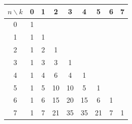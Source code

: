 \documentclass[punct]{ctexbeamer}
\begin{document}
\begin{frame}
    \begin{minipage}{0.65\linewidth}
        \begin{table}[]
            \begin{tabular}{c|cccccccc}
                $n\backslash k$ & 0 & 1 & 2  & 3  & 4 & 5 & 6 & 7 \\ \hline
                0 & 1 &   &    &    &   &   & 	& \\
                1 & 1 & 1 &    &    &   &   & 	& \\
                2 & 1 & 2 &\cellcolor{green}1  &    &   &   & 	& \\
                3 & 1 & 3 & \cellcolor{green}3  & 1  &   &   &	& \\
                4 & 1 & 4 & \cellcolor{green}6  & 4  & 1 &   &  & \\
                5 & 1 & 5 & \cellcolor{green}10 & 10 & 5 & 1 & & \\
                6 & 1 & 6 & \cellcolor{green}15 & 20 & 15 & 6 & 1&  \\
                7 & 1 & 7 & 21 & \cellcolor{red}35 & 35 & 21 & 7 & 1\\
            \end{tabular}
        \end{table}
    \end{minipage}
    \begin{minipage}{0.3\linewidth}
        \begin{figure}
            \centering

\end{figure}
\end{minipage}
\end{frame}
\end{document}
